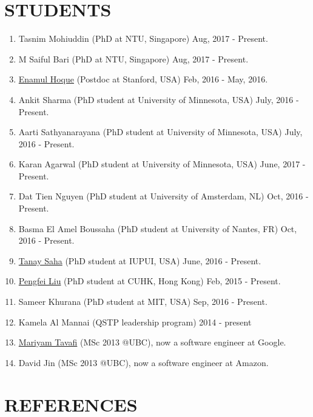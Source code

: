 \documentclass[paper=letter,fontsize=11pt]{scrartcl} %
\newcommand{\NewPart}[2]{\section*{\uppercase{#1} #2}}
\begin{document}
\NewPart{Students}{}
\begin{enumerate}
\item {} {Tasnim Mohiuddin} (PhD at NTU, Singapore) Aug, 2017 - Present.
\item {} {M Saiful Bari} (PhD at NTU, Singapore) Aug, 2017 - Present.
\item \href{http://www.cs.ubc.ca/~enamul/index.html} {Enamul Hoque} (Postdoc at Stanford, USA) Feb, 2016 - May, 2016. 
\item  {Ankit Sharma} (PhD student at University of Minnesota, USA) July, 2016 - Present. 
\item  {Aarti Sathyanarayana} (PhD student at University of Minnesota, USA) July, 2016 - Present. 
\item  {Karan Agarwal} (PhD student at University of Minnesota, USA) June, 2017 - Present. 
\item  {Dat Tien Nguyen} (PhD student at University of Amsterdam, NL) Oct, 2016 - Present. 
\item  {Basma El Amel Boussaha} (PhD student at University of Nantes, FR) Oct, 2016 - Present. 
\item \href{https://www.linkedin.com/in/tanaykumarsaha} {Tanay Saha} (PhD student at IUPUI, USA) June, 2016 - Present. 
\item \href{https://www.linkedin.com/in/pengfei-liu-35335333} {Pengfei Liu} (PhD student at CUHK, Hong Kong) Feb, 2015 - Present. 
\item  {Sameer Khurana} (PhD student at MIT, USA) Sep, 2016 - Present. 
\item {Kamela Al Mannai} (QSTP leadership program) 2014 - present
\item \href{https://www.linkedin.com/in/maryamtavafi} {Mariyam Tavafi} (MSc 2013 @UBC), now a software engineer at Google. 
\item {David Jin} (MSc 2013 @UBC), now a software engineer at Amazon.
\end{enumerate}

\NewPart{References}{}
\end{document}
